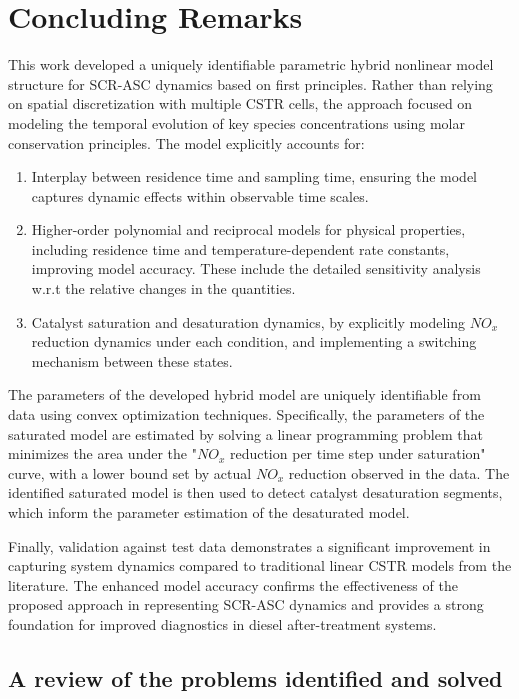\newpage
\section{Concluding Remarks}
This work developed a uniquely identifiable parametric hybrid nonlinear model structure for SCR-ASC dynamics based on
first principles. Rather than relying on spatial discretization with multiple CSTR cells, the approach focused on modeling the temporal evolution of key species concentrations using molar conservation principles. The model explicitly accounts for:

\begin{enumerate}
        \item Interplay between residence time and sampling time, ensuring the model captures dynamic effects within observable time scales.
        \item Higher-order polynomial and reciprocal models for physical properties, including residence time and temperature-dependent rate constants, improving model accuracy. These include the detailed sensitivity analysis w.r.t the relative changes in the quantities.
        \item Catalyst saturation and desaturation dynamics, by explicitly modeling $NO_x$ reduction dynamics under each condition, and implementing a switching mechanism between these states.
\end{enumerate}

The parameters of the developed hybrid model are uniquely identifiable from data using convex optimization techniques.
Specifically, the parameters of the saturated model are estimated by solving a linear programming problem that minimizes
the area under the "$NO_x$ reduction per time step under saturation" curve, with a lower bound set by actual $NO_x$
reduction observed in the data. The identified saturated model is then used to detect catalyst desaturation segments,
which inform the parameter estimation of the desaturated model.

Finally, validation against test data demonstrates a significant improvement in capturing system dynamics compared to
traditional linear CSTR models from the literature. The enhanced model accuracy confirms the effectiveness of the
proposed approach in representing SCR-ASC dynamics and provides a strong foundation for improved diagnostics in diesel
after-treatment systems.


\subsection{A review of the problems identified and solved}

